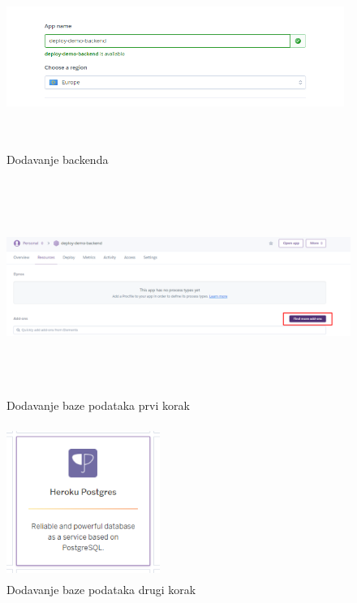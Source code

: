 			\begin{figure}[H]
				\includegraphics[width=110mm, height=60mm]{slike/heroku-create-b.png} %
				\centering
				\caption{Dodavanje backenda}
				\label{fig:dijagramdeployment}
			\end{figure}
			\begin{figure}[H]
				\includegraphics[width=150mm, height=70mm]{slike/heroku-adddb.png} %
				\centering
				\caption{Dodavanje baze podataka prvi korak}
				\label{fig:dijagramdeployment}
			\end{figure}
			\begin{figure}[H]
				\includegraphics[width=50mm, height=50mm]{slike/heroku-pgaddon.png} %
				\centering
				\caption{Dodavanje baze podataka drugi korak}
				\label{fig:dijagramdeployment}
			\end{figure}
